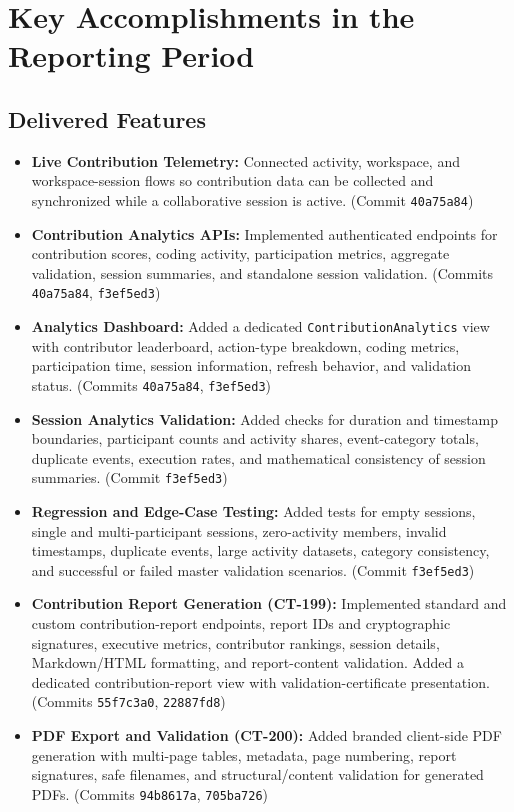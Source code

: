 \documentclass[11pt,a4paper]{article}
\begin{document}
\section{Key Accomplishments in the Reporting Period}

\subsection{Delivered Features}
\begin{itemize}
    \item \textbf{Live Contribution Telemetry:} Connected activity, workspace, and workspace-session flows so contribution data can be collected and synchronized while a collaborative session is active. (Commit \texttt{40a75a84})
    \item \textbf{Contribution Analytics APIs:} Implemented authenticated endpoints for contribution scores, coding activity, participation metrics, aggregate validation, session summaries, and standalone session validation. (Commits \texttt{40a75a84}, \texttt{f3ef5ed3})
    \item \textbf{Analytics Dashboard:} Added a dedicated \texttt{ContributionAnalytics} view with contributor leaderboard, action-type breakdown, coding metrics, participation time, session information, refresh behavior, and validation status. (Commits \texttt{40a75a84}, \texttt{f3ef5ed3})
    \item \textbf{Session Analytics Validation:} Added checks for duration and timestamp boundaries, participant counts and activity shares, event-category totals, duplicate events, execution rates, and mathematical consistency of session summaries. (Commit \texttt{f3ef5ed3})
    \item \textbf{Regression and Edge-Case Testing:} Added tests for empty sessions, single and multi-participant sessions, zero-activity members, invalid timestamps, duplicate events, large activity datasets, category consistency, and successful or failed master validation scenarios. (Commit \texttt{f3ef5ed3})
    \item \textbf{Contribution Report Generation (CT-199):} Implemented standard and custom contribution-report endpoints, report IDs and cryptographic signatures, executive metrics, contributor rankings, session details, Markdown/HTML formatting, and report-content validation. Added a dedicated contribution-report view with validation-certificate presentation. (Commits \texttt{55f7c3a0}, \texttt{22887fd8})
    \item \textbf{PDF Export and Validation (CT-200):} Added branded client-side PDF generation with multi-page tables, metadata, page numbering, report signatures, safe filenames, and structural/content validation for generated PDFs. (Commits \texttt{94b8617a}, \texttt{705ba726})

\end{itemize}
\end{document}
